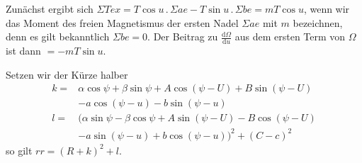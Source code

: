 Zunächst ergibt sich $\Sigma Tex=T\cos u\, .\, \Sigma ae-T\sin u\, .\, \Sigma be=mT\cos u$, wenn wir das Moment des freien Magnetismus der ersten Nadel $\Sigma ae$ mit $m$ bezeichnen, denn es gilt bekanntlich $\Sigma be=0$. Der Beitrag zu $\frac{\mathrm{d}\Omega}{\mathrm{d}u}$ aus dem ersten Term von $\Omega$ ist dann $=-mT\sin u$.

Setzen wir der Kürze halber
\[
\begin{aligned}
k={}&\alpha\cos\psi+\beta\sin\psi+A\cos(\psi-U)+B\sin(\psi-U)\\
&-a\cos(\psi-u)-b\sin(\psi-u)\\
l={}&(\alpha\sin\psi-\beta\cos\psi+A\sin(\psi-U)-B\cos(\psi-U)\\
&-a\sin(\psi-u)+b\cos(\psi-u))^2+(C-c)^2
\end{aligned}
\]
so gilt $rr=(R+k)^2+l$.

